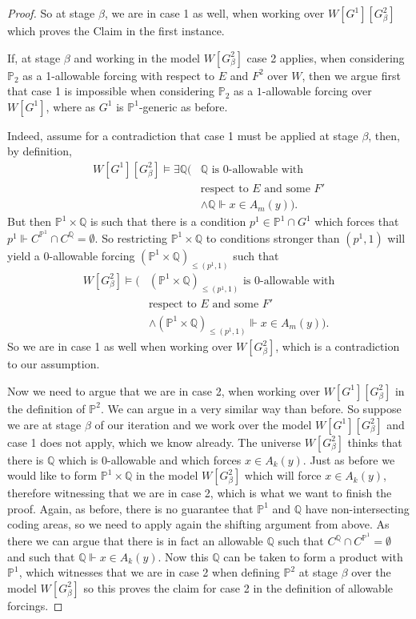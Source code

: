 \documentclass[a4paper,11pt]{article}
\newcommand{\forceP}{\mathbb{P}}
\newcommand{\forceQ}{\mathbb{Q}}
\begin{document}
\begin{proof}
So at stage $\beta$, we are in case 1 as well, when working over $W[G^1][G^2_{\beta}]$ which proves the Claim in the first instance.

If, at stage $\beta$ and working in the model $W[G_{\beta}^2]$ case 2 applies, when considering $ \forceP_2$ as a 1-allowable forcing with respect to $E$ and $F^2$ over $W$, then we argue first that case 1 is impossible when considering $\forceP_2$ as a $1$-allowable forcing over $W[G^1]$, where as $G^1$ is $\forceP^1$-generic as before.


Indeed, assume for a contradiction that case 1 must be applied at stage $\beta$, then, by definition,
\begin{align*}
W [G^1] [G^2_{\beta}] \models  \exists \forceQ (&\forceQ \text{ is } 0 \text{-allowable with} \\&
\text{respect to } E \text{ and some $F'$}  \\&  \land
\forceQ \Vdash {x} \in A_m({y})).
\end{align*}
But then $\forceP^1 \times \forceQ$ is such that there is a condition $p^1 \in \forceP^1 \cap G^1$ which forces that $p^1 \Vdash C^{\forceP^1} \cap C^{\forceQ} = \emptyset$. So restricting $\forceP^1 \times \forceQ$ to conditions stronger than $(p^1,1)$ will yield a $0$-allowable forcing $(\forceP^1 \times \forceQ)_{\le (p^1,1)} $ such that 
\begin{align*}
W [G^2_{\beta}] \models  (&(\forceP^1 \times \forceQ)_{\le (p^1,1)} \text{ is } 0 \text{-allowable with} \\&
\text{respect to } E \text{ and some $F'$ }  \\&  \land
(\forceP^1 \times \forceQ)_{\le (p^1,1)} \Vdash {x} \in A_m({y})).
\end{align*}
So we are in case 1 as well when working over $W [G^2_{\beta}]$, which is a contradiction to our assumption.

Now we need to argue that we are in case 2, when working over $W[G^1][G^2_{\beta}]$ in the definition of $\forceP^2$. We can argue in a very similar way than before. So suppose we are at stage $\beta$ of our iteration and we work over the model $W[G^1][G^2_{\beta}]$ and case 1 does not apply, which we know already. The universe $W[G^2_{\beta}]$ thinks that there is $\forceQ$ which is 0-allowable and which forces $x \in A_k(y)$. Just as before we would like to form $\forceP^1 \times \forceQ$ in the model $W[G^2_{\beta}]$ which will force $x \in A_k(y)$, therefore witnessing that we are in case 2, which is what we want to finish the proof. Again, as before, there is no guarantee that $\forceP^1$ and $\forceQ$ have non-intersecting coding areas, so we need to apply again the shifting argument from above.
As there we can argue that there is in fact an allowable $\forceQ$ such that $C^{\forceQ} \cap C^{\forceP^1}= \emptyset$ and such that $\forceQ \Vdash x \in A_k (y)$. Now this $\forceQ$ can be taken to form a product with $\forceP^1$, which witnesses that we are in case 2 when defining $\forceP^2$ at stage $\beta$ over the model $W[G^2_{\beta}]$ so this proves the claim for case 2 in the definition of allowable forcings.


\end{proof}
\end{document}
